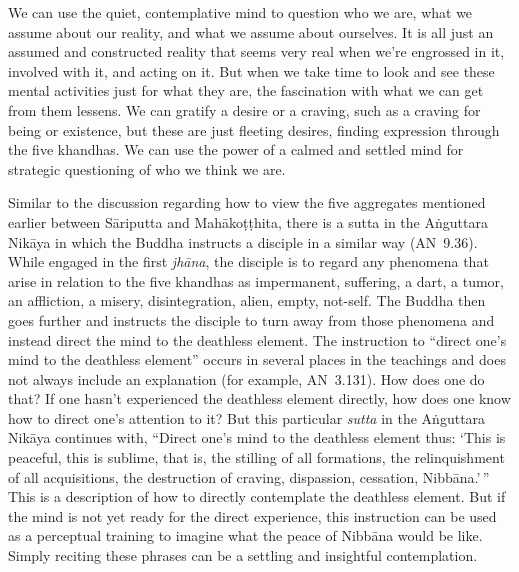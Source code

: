 We can use the quiet, contemplative mind to question who we are, what we assume about our reality, and what we assume about ourselves. It is all just an assumed and constructed reality that seems very real when we're engrossed in it, involved with it, and acting on it. But when we take time to look and see these mental activities just for what they are, the fascination with what we can get from them lessens. We can gratify a desire or a craving, such as a craving for being or existence, but these are just fleeting desires, finding expression through the five khandhas. We can use the power of a calmed and settled mind for strategic questioning of who we think we are.

Similar to the discussion regarding how to view the five aggregates mentioned earlier between Sāriputta and Mahākoṭṭhita, there is a sutta in the Aṅguttara Nikāya in which the Buddha instructs a disciple in a similar way \mbox{(AN 9.36)}. While engaged in the first \emph{jhāna}, the disciple is to regard any phenomena that arise in relation to the five khandhas as impermanent, suffering, a dart, a tumor, an affliction, a misery, disintegration, alien, empty, not-self. The Buddha then goes further and instructs the disciple to turn away from those phenomena and instead direct the mind to the deathless element. The instruction to ``direct one's mind to the deathless element'' occurs in several places in the teachings and does not always include an explanation (for example, \mbox{AN 3.131}). How does one do that? If one hasn't experienced the deathless element directly, how does one know how to direct one's attention to it? But this particular \emph{sutta} in the Aṅguttara Nikāya continues with, ``Direct one's mind to the deathless element thus: `This is peaceful, this is sublime, that is, the stilling of all formations, the relinquishment of all acquisitions, the destruction of craving, dispassion, cessation, Nibbāna.'\,'' This is a description of how to directly contemplate the deathless element. But if the mind is not yet ready for the direct experience, this instruction can be used as a perceptual training to imagine what the peace of Nibbāna would be like. Simply reciting these phrases can be a settling and insightful contemplation.

